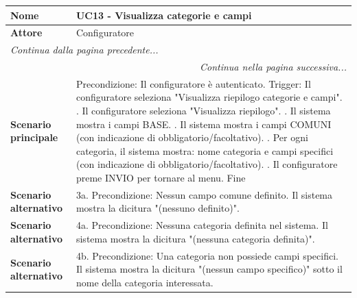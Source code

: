 \documentclass[12pt, a4paper, oneside]{report}
\begin{document}
\renewcommand{\arraystretch}{1.4} 

\begin{tabularx}{\textwidth}{|l|X|}
    \hline
    \textbf{Nome}               & \textbf{UC13 - Visualizza categorie e campi} \\ \hline
    \textbf{Attore}             & Configuratore \\ \hline
    \endfirsthead 

    \hline
    \multicolumn{2}{|l|}{\textit{Continua dalla pagina precedente...}} \\ \hline
    \endhead 

    \hline
    \multicolumn{2}{|r|}{\textit{Continua nella pagina successiva...}} \\ \hline
    \endfoot 

    \hline
    \endlastfoot

    \textbf{Scenario principale} & 
    Precondizione: Il configuratore è autenticato. \newline
    Trigger: Il configuratore seleziona "Visualizza riepilogo categorie e campi". \newline
    1. Il configuratore seleziona "Visualizza riepilogo". \newline
    2. Il sistema mostra i campi BASE. \newline
    3. Il sistema mostra i campi COMUNI (con indicazione di obbligatorio/facoltativo). \newline
    4. Per ogni categoria, il sistema mostra: nome categoria e campi specifici (con indicazione di obbligatorio/facoltativo). \newline
    5. Il configuratore preme INVIO per tornare al menu. \newline
    Fine \\ \hline
    
    \textbf{Scenario alternativo} & 
    3a. Precondizione: Nessun campo comune definito. \newline
    Il sistema mostra la dicitura "(nessuno definito)". \\ \hline

    \textbf{Scenario alternativo} & 
    4a. Precondizione: Nessuna categoria definita nel sistema. \newline
    Il sistema mostra la dicitura "(nessuna categoria definita)". \\ \hline

    \textbf{Scenario alternativo} & 
    4b. Precondizione: Una categoria non possiede campi specifici. \newline
    Il sistema mostra la dicitura "(nessun campo specifico)" sotto il nome della categoria interessata. \\ \hline
\end{tabularx}
\end{document}
